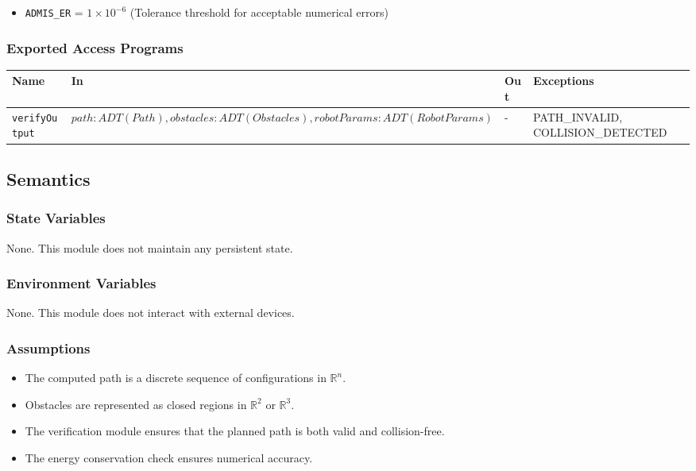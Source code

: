 \documentclass[12pt, titlepage]{article}
\begin{document}
\begin{itemize}
    \item \texttt{ADMIS\_ER} = \(1 \times 10^{-6}\) (Tolerance threshold for acceptable numerical errors)
\end{itemize}

\subsubsection{Exported Access Programs}

\begin{center}
\begin{tabular}{p{4cm} p{6cm} p{3cm} p{3cm}}
    \toprule
    \textbf{Name} & \textbf{In} & \textbf{Out} & \textbf{Exceptions} \\
    \midrule
    \texttt{verifyOutput} & $path: ADT(Path), obstacles: ADT(Obstacles), robotParams: ADT(RobotParams)$ & - & PATH\_INVALID, COLLISION\_DETECTED \\[4pt]
    \bottomrule
\end{tabular}
\end{center}

\subsection{Semantics}

\subsubsection{State Variables}

None. This module does not maintain any persistent state.

\subsubsection{Environment Variables}

None. This module does not interact with external devices.

\subsubsection{Assumptions}

\begin{itemize}
    \item The computed path is a discrete sequence of configurations in \( \mathbb{R}^n \).
    \item Obstacles are represented as closed regions in \( \mathbb{R}^2 \) or \( \mathbb{R}^3 \).
    \item The verification module ensures that the planned path is both valid and collision-free.
    \item The energy conservation check ensures numerical accuracy.
\end{itemize}
\end{document}
